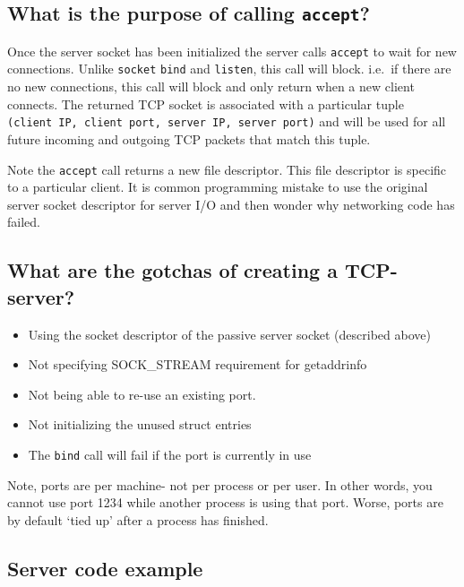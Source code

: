 \subsection{\texorpdfstring{What is the purpose of calling
\texttt{accept}?}{What is the purpose of calling accept?}}\label{what-is-the-purpose-of-calling-accept}

Once the server socket has been initialized the server calls
\texttt{accept} to wait for new connections. Unlike \texttt{socket}
\texttt{bind} and \texttt{listen}, this call will block. i.e.~if there
are no new connections, this call will block and only return when a new
client connects. The returned TCP socket is associated with a particular
tuple \texttt{(client\ IP,\ client\ port,\ server\ IP,\ server\ port)}
and will be used for all future incoming and outgoing TCP packets that
match this tuple.

Note the \texttt{accept} call returns a new file descriptor. This file
descriptor is specific to a particular client. It is common programming
mistake to use the original server socket descriptor for server I/O and
then wonder why networking code has failed.

\subsection{What are the gotchas of creating a
TCP-server?}\label{what-are-the-gotchas-of-creating-a-tcp-server}

\begin{itemize}
\tightlist
\item
  Using the socket descriptor of the passive server socket (described
  above)
\item
  Not specifying SOCK\_STREAM requirement for getaddrinfo
\item
  Not being able to re-use an existing port.
\item
  Not initializing the unused struct entries
\item
  The \texttt{bind} call will fail if the port is currently in use
\end{itemize}

Note, ports are per machine- not per process or per user. In other
words, you cannot use port 1234 while another process is using that
port. Worse, ports are by default `tied up' after a process has
finished.

\subsection{Server code example}\label{server-code-example}

